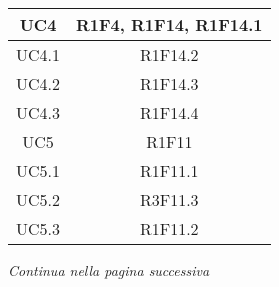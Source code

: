 \begin{table}[H]
\begin{tabular}{c | c}
		UC4                                                     & R1F4, R1F14, R1F14.1 \\ \hline
		UC4.1                                                   & R1F14.2        \\ \hline
		UC4.2                                                   & R1F14.3        \\ \hline
		UC4.3                                                   & R1F14.4        \\ \hline
		UC5                                                     & R1F11          \\ \hline
		UC5.1                                                   & R1F11.1        \\ \hline
		UC5.2                                                   & R3F11.3        \\ \hline
		UC5.3                                                   & R1F11.2        \\ \hline
	\end{tabular}
\end{table}
\begin{center}
	\textit{\small Continua nella pagina successiva}
\end{center}
